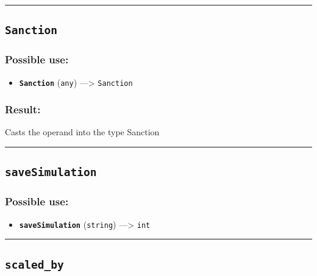 \documentclass[]{book}
\providecommand{\tightlist}{%
  \setlength{\itemsep}{0pt}\setlength{\parskip}{0pt}}
\theoremstyle{definition}
\theoremstyle{definition}
\theoremstyle{definition}
\theoremstyle{remark}
\begin{document}
\begin{center}\rule{0.5\linewidth}{\linethickness}\end{center}

\subsection{\texorpdfstring{\texttt{Sanction}}{Sanction}}\label{sanction}

\subsubsection{Possible use:}\label{possible-use-449}

\begin{itemize}
\tightlist
\item
  \textbf{\texttt{Sanction}} (\texttt{any}) ---\textgreater{}
  \texttt{Sanction}
\end{itemize}

\subsubsection{Result:}\label{result-435}

Casts the operand into the type Sanction

\begin{center}\rule{0.5\linewidth}{\linethickness}\end{center}

\subsection{\texorpdfstring{\texttt{saveSimulation}}{saveSimulation}}\label{savesimulation}

\subsubsection{Possible use:}\label{possible-use-450}

\begin{itemize}
\tightlist
\item
  \textbf{\texttt{saveSimulation}} (\texttt{string}) ---\textgreater{}
  \texttt{int}
\end{itemize}

\begin{center}\rule{0.5\linewidth}{\linethickness}\end{center}

\subsection{\texorpdfstring{\texttt{scaled\_by}}{scaled\_by}}\label{scaled_by}
\end{document}
